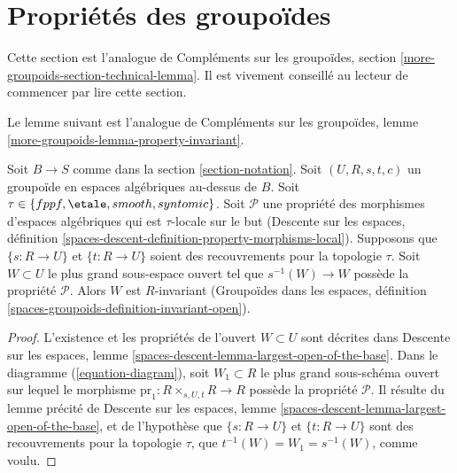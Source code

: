 \section{Propriétés des groupoïdes}
\label{section-technical-lemma}

\noindent
Cette section est l'analogue de
Compléments sur les groupoïdes, section \ref{more-groupoids-section-technical-lemma}.
Il est vivement conseillé au lecteur de commencer par lire cette section.

\medskip\noindent
Le lemme suivant est l'analogue de
Compléments sur les groupoïdes, lemme \ref{more-groupoids-lemma-property-invariant}.

\begin{lemma}
\label{lemma-property-invariant}
Soit $B \to S$ comme dans la section \ref{section-notation}.
Soit $(U, R, s, t, c)$ un groupoïde en espaces algébriques au-dessus de $B$.
Soit
$\tau \in \{fppf, \linebreak[0] \etale, \linebreak[0]
smooth, \linebreak[0] syntomic\}$.
Soit $\mathcal{P}$ une propriété des morphismes d'espaces algébriques
qui est $\tau$-locale sur le but
(Descente sur les espaces,
définition \ref{spaces-descent-definition-property-morphisms-local}).
Supposons que $\{s : R \to U\}$ et $\{t : R \to U\}$ soient des recouvrements
pour la topologie $\tau$. Soit $W \subset U$ le plus grand sous-espace ouvert
tel que $s^{-1}(W) \to W$ possède la propriété $\mathcal{P}$.
Alors $W$ est $R$-invariant
(Groupoïdes dans les espaces,
définition \ref{spaces-groupoids-definition-invariant-open}).
\end{lemma}

\begin{proof}
L'existence et les propriétés de l'ouvert $W \subset U$ sont décrites dans
Descente sur les espaces, lemme \ref{spaces-descent-lemma-largest-open-of-the-base}.
Dans le
diagramme (\ref{equation-diagram}),
soit $W_1 \subset R$ le plus grand sous-schéma ouvert sur lequel le morphisme
$\text{pr}_1 : R \times_{s, U, t} R \to R$ possède la propriété $\mathcal{P}$.
Il résulte du lemme précité de
Descente sur les espaces, lemme \ref{spaces-descent-lemma-largest-open-of-the-base},
et de l'hypothèse que $\{s : R \to U\}$ et $\{t : R \to U\}$ sont des
recouvrements pour la topologie $\tau$, que $t^{-1}(W)=W_1=s^{-1}(W)$, comme voulu.
\end{proof}

